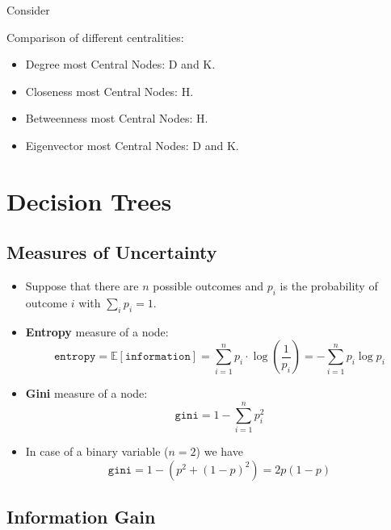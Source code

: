 
Consider


Comparison of different centralities:
\begin{itemize}
    \item Degree most Central Nodes: D and K.
    \item Closeness most Central Nodes: H.
    \item Betweenness most Central Nodes: H.
    \item Eigenvector most Central Nodes: D and K.
\end{itemize}

\section{Decision Trees}

\subsection{Measures of Uncertainty}

\begin{itemize}
    \item Suppose that there are $n$ possible outcomes and $p_{i}$ is the probability of outcome $i$ with $\sum _{i} p_{i} =1$.
    \item \textbf{Entropy} measure of a node:
    \begin{equation*}
        \texttt{entropy} =\mathbb{E}\left[\texttt{information}\right] =\sum _{i=1}^{n} p_{i} \cdot \log\left(\frac{1}{p_{i}}\right) =-\sum _{i=1}^{n} p_{i}\log p_{i}
    \end{equation*}
    \item \textbf{Gini} measure of a node:
    \begin{equation*}
        \texttt{gini} = 1 - \sum_{i=1}^{n} p_{i}^{2}
    \end{equation*}
    \item In case of a binary variable ($n=2$) we have
    \begin{equation*}
        \texttt{gini} = 1 - (p^{2} + (1-p)^{2}) = 2p(1-p)
    \end{equation*}
\end{itemize}

\subsection{Information Gain}

